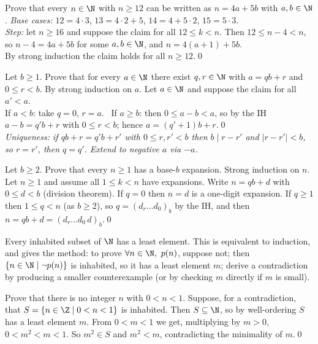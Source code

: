 \begin{hexample}
Prove that every $n\in\N$ with $n\ge12$ can be written as $n=4a+5b$ with $a,b\in\N$.
\solution
\emph{Base cases:} $12=4\cdot3$, $13=4\cdot2+5$, $14=4+5\cdot2$, $15=5\cdot3$.\\
\emph{Step:} let $n\ge16$ and suppose the claim for all $12\le k<n$. Then $12\le n-4<n$, so $n-4=4a+5b$ for some $a,b\in\N$, and $n=4(a+1)+5b$.\\
By strong induction the claim holds for all $n\ge12$.\qed
\end{hexample}

\begin{hexample}
Let $b\ge1$. Prove that for every $a\in\N$ there exist $q,r\in\N$ with $a=qb+r$ and $0\le r<b$.
\solution
By strong induction on $a$. Let $a\in\N$ and suppose the claim for all $a'<a$.\\
If $a<b$: take $q=0$, $r=a$. \ If $a\ge b$: then $0\le a-b<a$, so by the IH $a-b=q'b+r$ with $0\le r<b$; hence $a=(q'+1)b+r$.\qed\\
\emph{Uniqueness: if $qb+r=q'b+r'$ with $0\le r,r'<b$ then $b\mid r-r'$ and $|r-r'|<b$, so $r=r'$, then $q=q'$. Extend to negative $a$ via $-a$.}
\end{hexample}

\begin{hexample}\label{ex:baseb}
Let $b\ge2$. Prove that every $n\ge1$ has a base-$b$ expansion.
\solution
Strong induction on $n$. Let $n\ge1$ and assume all $1\le k<n$ have expansions. Write $n=qb+d$ with $0\le d<b$ (division theorem). If $q=0$ then $n=d$ is a one-digit expansion. If $q\ge1$ then $1\le q<n$ (as $b\ge2$), so $q=(d_r\dots d_0)_b$ by the IH, and then $n=qb+d=(d_r\dots d_0\,d)_b$.\qed
\end{hexample}

\begin{key}
Every inhabited subset of $\N$ has a least element. This is equivalent to induction, and gives the  method: to prove $\forall n\in\N,\ p(n)$, suppose not; then $\{n\in\N\mid\neg p(n)\}$ is inhabited, so it has a least element $m$; derive a contradiction by producing a smaller counterexample (or by checking $m$ directly if $m$ is small).
\end{key}

\begin{hexample}
Prove that there is no integer $n$ with $0<n<1$.
\solution
Suppose, for a contradiction, that $S=\{n\in\Z\mid 0<n<1\}$ is inhabited. Then $S\subseteq\N$, so by well-ordering $S$ has a least element $m$. From $0<m<1$ we get, multiplying by $m>0$, $0<m^2<m<1$. So $m^2\in S$ and $m^2<m$, contradicting the minimality of $m$.\qed
\end{hexample}

